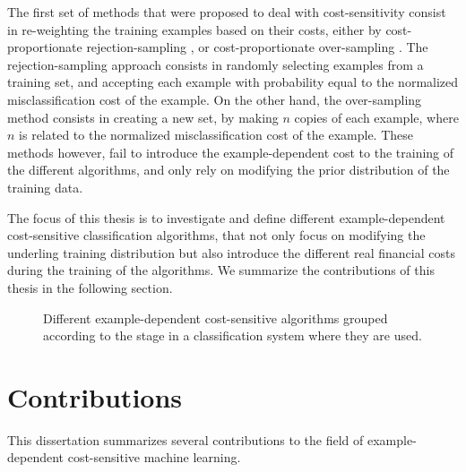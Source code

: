   The first set of methods that were proposed to deal with cost-sensitivity consist in 
  re-weighting the training examples based on their costs, either by cost-proportionate 
  rejection-sampling \citep{Zadrozny2003}, or cost-proportionate over-sampling \citep{Elkan2001}.
  The rejection-sampling approach consists in randomly selecting examples from a training set, and 
  accepting each example with probability equal to the normalized misclassification cost of the 
  example. On the other hand, the over-sampling method consists in creating a new set, by making 
  $n$ copies of each example, where $n$ is related to the normalized misclassification cost of the 
  example. These methods however, fail to introduce the example-dependent cost to the training of 
  the different algorithms, and only rely on modifying the prior distribution of the training data.

  The focus of this thesis is to investigate and define different example-dependent cost-sensitive
  classification algorithms, that not only focus on modifying the underling training 
  distribution but also introduce the different real financial costs during the training of the 
  algorithms. We summarize the contributions of this thesis in the following section.
  
  \begin{figure}
  \centering
  
  \caption{Different example-dependent cost-sensitive algorithms grouped according to the 
    stage in a classification system where they are used.}
  \label{fig:1:1}
  \end{figure}
  
\section{Contributions}

This dissertation summarizes several contributions to the field of example-dependent 
cost-sensitive machine learning.
  
